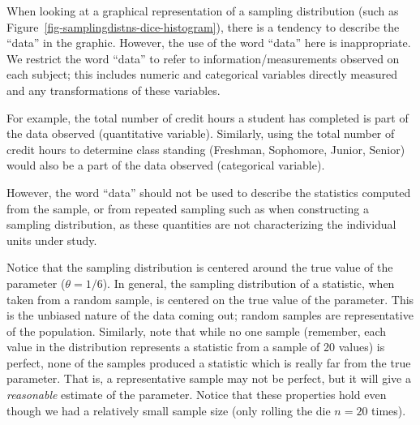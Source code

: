 \documentclass[
  letterpaper,
  DIV=11,
  numbers=noendperiod]{scrreprt}
\theoremstyle{plain}
\theoremstyle{definition}
\theoremstyle{definition}
\theoremstyle{remark}
\begin{document}
\begin{tcolorbox}[enhanced jigsaw, breakable, titlerule=0mm, colframe=quarto-callout-warning-color-frame, bottomtitle=1mm, opacityback=0, rightrule=.15mm, toptitle=1mm, arc=.35mm, bottomrule=.15mm, left=2mm, title=\textcolor{quarto-callout-warning-color}{\faExclamationTriangle}\hspace{0.5em}{Warning}, leftrule=.75mm, coltitle=black, toprule=.15mm, colbacktitle=quarto-callout-warning-color!10!white, colback=white, opacitybacktitle=0.6]

When looking at a graphical representation of a sampling distribution
(such as Figure~\ref{fig-samplingdistns-dice-histogram}), there is a
tendency to describe the ``data'' in the graphic. However, the use of
the word ``data'' here is inappropriate. We restrict the word ``data''
to refer to information/measurements observed on each subject; this
includes numeric and categorical variables directly measured and any
transformations of these variables.

For example, the total number of credit hours a student has completed is
part of the data observed (quantitative variable). Similarly, using the
total number of credit hours to determine class standing (Freshman,
Sophomore, Junior, Senior) would also be a part of the data observed
(categorical variable).

However, the word ``data'' should not be used to describe the statistics
computed from the sample, or from repeated sampling such as when
constructing a sampling distribution, as these quantities are not
characterizing the individual units under study.

\end{tcolorbox}

Notice that the sampling distribution is centered around the true value
of the parameter (\(\theta = 1/6\)). In general, the sampling
distribution of a statistic, when taken from a random sample, is
centered on the true value of the parameter. This is the unbiased nature
of the data coming out; random samples are representative of the
population. Similarly, note that while no one sample (remember, each
value in the distribution represents a statistic from a sample of 20
values) is perfect, none of the samples produced a statistic which is
really far from the true parameter. That is, a representative sample may
not be perfect, but it will give a \emph{reasonable} estimate of the
parameter. Notice that these properties hold even though we had a
relatively small sample size (only rolling the die \(n = 20\) times).
\end{document}
